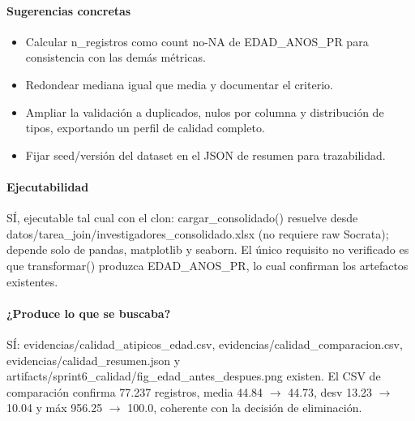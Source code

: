 \paragraph{Sugerencias concretas}
\begin{itemize}
  \item Calcular n\_registros como count no-NA de EDAD\_ANOS\_PR para consistencia con las demás métricas.
  \item Redondear mediana igual que media y documentar el criterio.
  \item Ampliar la validación a duplicados, nulos por columna y distribución de tipos, exportando un perfil de calidad completo.
  \item Fijar seed/versión del dataset en el JSON de resumen para trazabilidad.
\end{itemize}

\paragraph{Ejecutabilidad}
SÍ, ejecutable tal cual con el clon: cargar\_consolidado() resuelve desde datos/tarea\_join/investigadores\_consolidado.xlsx (no requiere raw Socrata); depende solo de pandas, matplotlib y seaborn. El único requisito no verificado es que transformar() produzca EDAD\_ANOS\_PR, lo cual confirman los artefactos existentes.

\paragraph{¿Produce lo que se buscaba?}
SÍ: evidencias/calidad\_atipicos\_edad.csv, evidencias/calidad\_comparacion.csv, evidencias/calidad\_resumen.json y artifacts/sprint6\_calidad/fig\_edad\_antes\_despues.png existen. El CSV de comparación confirma 77.237 registros, media 44.84 $\rightarrow$ 44.73, desv 13.23 $\rightarrow$ 10.04 y máx 956.25 $\rightarrow$ 100.0, coherente con la decisión de eliminación.

